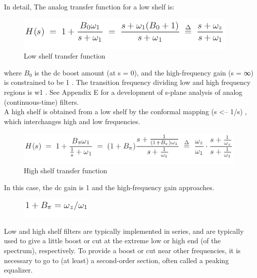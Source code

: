 \documentclass[runningheads,a4paper]{llncs}
\begin{document}
In detail, The analog transfer function for a low shelf is:\\
\begin{figure}[H]
\includegraphics[scale=0.60]{high_shelf_formula.png}
\caption{Low shelf transfer function \cite{22}}
\label{fig:framework}
\end{figure}

where $B_0$ is the dc boost amount (at s = 0), and the high-frequency gain (s = ∞) is constrained to be 1 . The transition frequency dividing low and high frequency regions is w1 . See Appendix E for a development of s-plane analysis of analog (continuous-time) filters. \cite{23}\\
A high shelf is obtained from a low shelf by the conformal mapping (s <-- 1/s) , which interchanges high and low frequencies.\\
\begin{figure}[H]
\includegraphics[scale=0.60]{high_shelf_formula2.png}
\caption{High shelf transfer function \cite{22}}
\label{fig:framework}
\end{figure}

In this case, the dc gain is 1 and the high-frequency gain approaches.\\
\begin{figure}[H]
\includegraphics[scale=0.60]{shelf_formula3.png}
\label{fig:framework}
\end{figure}

Low and high shelf filters are typically implemented in series, and are typically used to give a little boost or cut at the extreme low or high end (of the spectrum), respectively. To provide a boost or cut near other frequencies, it is necessary to go to (at least) a second-order section, often called a peaking equalizer. \cite{23}\\
\end{document}

